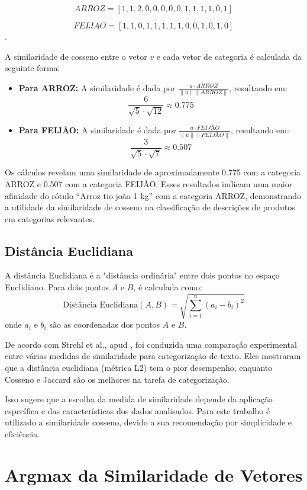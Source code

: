\[ARROZ = [1,1,2,0,0,0,0,0,1,1,1,1,0,1]\] 

\[FEIJAO = [1,1,0,1,1,1,1,1,0,0,1,0,1,0]\].

A similaridade de cosseno entre o vetor \(v\) e cada vetor de categoria é calculada da seguinte forma:

\begin{itemize}
    \item \textbf{Para ARROZ:} A similaridade é dada por \(\frac{u \cdot ARROZ}{\|u\|\|ARROZ\|}\), resultando em:
    \[\frac{6}{\sqrt{5} \cdot \sqrt{12}} \approx 0.775\]

    \item \textbf{Para FEIJÃO:} A similaridade é dada por \(\frac{u \cdot FEIJÃO}{\|u\|\|FEIJÃO\|}\), resultando em:
    \[\frac{3}{\sqrt{5} \cdot \sqrt{7}} \approx 0.507\]
\end{itemize}

Os cálculos revelam uma similaridade de aproximadamente 0.775 com a categoria ARROZ e 0.507 com a categoria FEIJÃO. Esses resultados indicam uma maior afinidade do rótulo ``Arroz tio joão 1 kg'' com a categoria ARROZ, demonstrando a utilidade da similaridade de cosseno na classificação de descrições de produtos em categorias relevantes.


\subsection{Distância Euclidiana}
A distância Euclidiana é a "distância ordinária" entre dois pontos no espaço Euclidiano. Para dois pontos $A$ e $B$, é calculada como:
\begin{equation}
    \text{Distância Euclidiana}(A, B) = \sqrt{\sum_{i=1}^{n} (a_i - b_i)^2}
\end{equation}
onde $a_i$ e $b_i$ são as coordenadas dos pontos $A$ e $B$.

De acordo com Strehl et al., apud \cite{deng2019feature}, foi conduzida uma comparação experimental entre várias medidas de similaridade para categorização de texto. Eles mostraram que a distância euclidiana (métrica L2) tem o pior desempenho, enquanto Cosseno e Jaccard são os melhores na tarefa de categorização. 

Isso sugere que a escolha da medida de similaridade depende da aplicação específica e das características dos dados analisados. Para este trabalho é utilizado a similaridade cosseno, devido a sua recomendação por simplicidade e eficiência.

\section{Argmax da Similaridade de Vetores}

